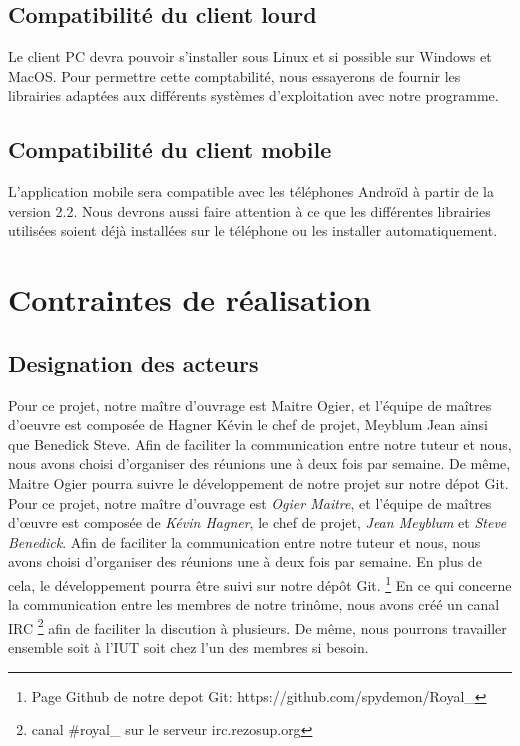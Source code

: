 \subsection{Compatibilité du client lourd}
Le client PC devra pouvoir s'installer sous Linux et si possible sur Windows et MacOS. 
Pour permettre cette comptabilité, nous essayerons de fournir les librairies adaptées aux différents systèmes d'exploitation avec notre programme. 

\subsection{Compatibilité du client mobile}
L'application mobile sera compatible avec les téléphones Androïd à partir de la version 2.2. 
Nous devrons aussi faire attention à ce que les différentes librairies utilisées soient déjà installées sur le téléphone ou les installer automatiquement.

\section{Contraintes de réalisation}

\subsection{Designation des acteurs}
Pour ce projet, notre maître d'ouvrage est Maitre Ogier, et l'équipe de maîtres d'oeuvre est composée de Hagner Kévin le chef de projet, Meyblum Jean ainsi que Benedick Steve.
Afin de faciliter la communication entre notre tuteur et nous, nous avons choisi d'organiser des réunions une à deux fois par semaine. De même, Maitre Ogier pourra suivre le développement de notre projet sur notre dépot Git.
Pour ce projet, notre maître d'ouvrage est \emph{Ogier Maitre}, et l'équipe de maîtres d'œuvre est composée de \emph{Kévin Hagner}, le chef de projet, \emph{Jean Meyblum} et \emph{Steve Benedick}.
Afin de faciliter la communication entre notre tuteur et nous, nous avons choisi d'organiser des réunions une à deux fois par semaine. 
En plus de cela, le développement pourra être suivi sur notre dépôt Git.
\footnote{Page Github de notre depot Git: https://github.com/spydemon/Royal\_} 
En ce qui concerne la communication entre les membres de notre trinôme, nous avons créé un canal IRC \footnote{ canal \#royal\_ sur le serveur irc.rezosup.org} afin de faciliter la discution à plusieurs. 
De même, nous pourrons travailler ensemble soit à l'IUT soit chez l'un des membres si besoin.

